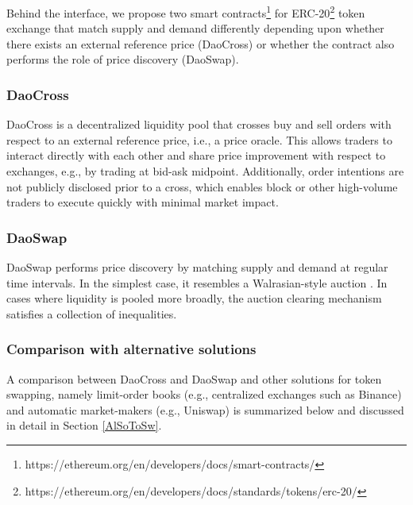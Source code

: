 \documentclass[11pt, reqno]{amsart}
\theoremstyle{definition}
\theoremstyle{remark}
\begin{document}
Behind the interface, we propose two smart
contracts\footnote{https://ethereum.org/en/developers/docs/smart-contracts/}
for
ERC-20\footnote{https://ethereum.org/en/developers/docs/standards/tokens/erc-20/}
token exchange that match supply and demand differently depending upon whether
there exists an external reference price (DaoCross) or whether the contract
also performs the role of price discovery (DaoSwap).

\subsubsection{DaoCross}
DaoCross is a decentralized liquidity pool that crosses buy and sell orders
with respect to an external reference price, i.e., a price oracle. This allows
traders to interact directly with each other and share price improvement with
respect to exchanges, e.g., by trading at bid-ask midpoint. Additionally, order
intentions are not publicly disclosed prior to a cross, which enables block or
other high-volume traders to execute quickly with minimal market impact.

\subsubsection{DaoSwap}
DaoSwap performs price discovery by matching supply and demand at regular time
intervals. In the simplest case, it resembles a Walrasian-style auction
\cite{Wa}. In cases where liquidity is pooled more broadly, the auction clearing
mechanism satisfies a collection of inequalities.


\subsubsection{Comparison with alternative solutions}
A comparison between DaoCross and DaoSwap and other solutions for token
swapping, namely limit-order books (e.g., centralized exchanges such as
Binance) and automatic market-makers (e.g., Uniswap) is summarized below
and discussed in detail in Section \ref{AlSoToSw}.
\end{document}
